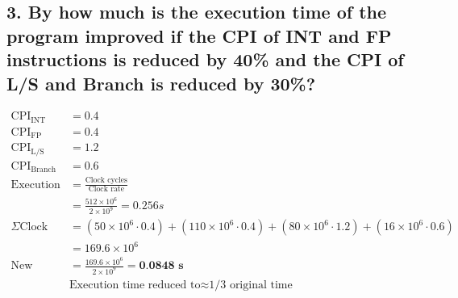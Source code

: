 \documentclass[11pt]{article}
\begin{document}
\subsection*{\small 3. By how much is the execution time of the program improved if the CPI of INT and FP instructions is reduced by 40\% and the CPI of L/S and Branch is reduced by 30\%?}
\begin{align*}
\textrm{CPI}_{\textrm{INT}} & = 0.4\\
\textrm{CPI}_{\textrm{FP}} & = 0.4\\
\textrm{CPI}_{\textrm{L/S}} & = 1.2\\
\textrm{CPI}_{\textrm{Branch}} & = 0.6\\
\textrm{Execution time} & = \frac{\textrm{Clock cycles}}{\textrm{Clock rate}}\\
& = \frac{512 \times 10^6}{2 \times 10^9} = 0.256 s\\
\Sigma \textrm{Clock Cycles} & = (50 \times 10^6 \cdot 0.4) + (110 \times 10^6 \cdot 0.4) + (80 \times 10^6 \cdot 1.2) + (16 \times 10^6 \cdot 0.6)\\
& = 169.6 \times 10^6\\
\textrm{New Execution Time} & = \frac{169.6 \times 10^6}{2 \times 10^9} = \textbf{0.0848 s}\\
& \textrm{Execution time reduced to} \approx \textrm{1/3 original time}
\end{align*}
\end{document}
